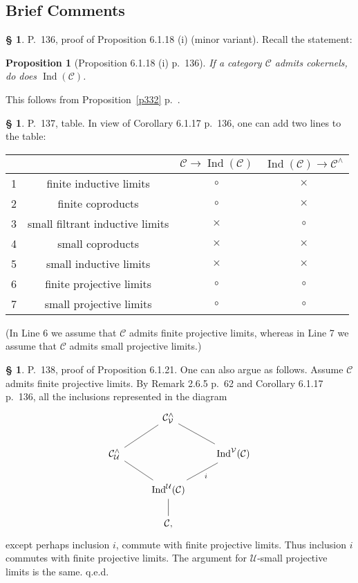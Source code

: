 \documentclass[12pt]{article}
\newtheorem{prop}[thm]{Proposition}
\theoremstyle{remark}
\theoremstyle{definition}
\newtheorem{s}[thm]{\S}
\newcommand{\nn}{\noindent}
\newcommand{\C}{\mathcal C}
\newcommand{\U}{\mathcal U}
\newcommand{\V}{\mathcal V}
\DeclareMathOperator{\Ind}{Ind}
\begin{document}

\subsection{Brief Comments}

\begin{s} 
P.~136, proof of Proposition 6.1.18 (i) (minor variant). Recall the statement: 

\begin{prop}[Proposition 6.1.18 (i) p.~136] 
If a category $\C$ admits cokernels, do does $\Ind(\C)$. 
\end{prop}

This follows from Proposition~\ref{p332} p.~\pageref{p332}. 


\end{s}

%

\begin{s} 
P.~137, table. In view of Corollary 6.1.17 p.~136, one can add two lines to the table:\bigskip 

\begin{center}
\begin{tabular}{|c|c|c|c|}\hline
&&$\C\to\Ind(\C)$&$\Ind(\C)\to\C^\wedge$\\ \hline
1&finite inductive limits&$\circ$&$\times$\\ \hline
2&finite coproducts&$\circ$&$\times$\\ \hline
3&small filtrant inductive limits&$\times$&$\circ$\\ \hline
4&small coproducts&$\times$&$\times$\\ \hline
5&small inductive limits&$\times$&$\times$\\ \hline
6&finite projective limits&$\circ$&$\circ$\\ \hline
7&small projective limits&$\circ$&$\circ$\\ \hline
\end{tabular}
\end{center}%
\nn(In Line 6 we assume that $\C$ admits finite projective limits, whereas in Line 7 we assume that $\C$ admits small projective limits.)%
\end{s}

%

\begin{s} 
P.~138, proof of Proposition 6.1.21. One can also argue as follows. Assume $\C$ admits finite projective limits. By Remark 2.6.5 p.~62 and Corollary 6.1.17 p.~136, all the inclusions represented in the diagram 
\[
\begin{tikzcd}
{}&\C^\wedge_\V\ar[-]{ld}\ar[-]{rd}\\
\C^\wedge_\U\ar[-]{rd}&&\Ind^\V(\C)\ar[-]{ld}{i}\\
&\Ind^\U(\C)\ar[-]{d}\\
&\C,
\end{tikzcd}
\]
except perhaps inclusion $i$, commute with finite projective limits. Thus inclusion $i$ commutes with finite projective limits. The argument for $\U$-small projective limits is the same. q.e.d.
\end{s}
\end{document}
